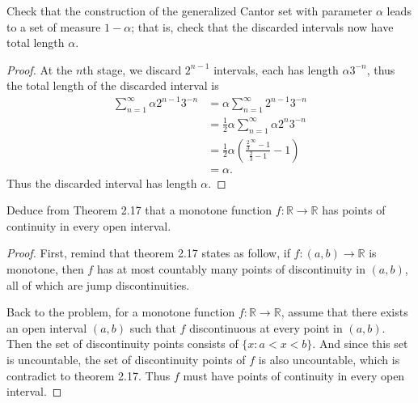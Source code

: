 \documentclass[12pt, a4paper]{article}
\theoremstyle{plain}
\newcommand{\R}{\mathbb{R}}
\begin{document}
\begin{exercise}{30}
Check that the construction of the generalized Cantor set with parameter $\alpha$ leads to a set of measure $1-\alpha$; that is, check that the discarded intervals now have total length $\alpha$.
\end{exercise}
	\begin{proof}
	At the $n$th stage, we discard $2^{n-1}$ intervals, each has length $\alpha 3^{-n}$, thus the total length of the discarded interval is
	\begin{align*}
	\sum_{n=1}^{\infty}{\alpha 2^{n-1}3^{-n}}&=\alpha\sum_{n=1}^{\infty}{2^{n-1}3^{-n}}\\
	&=\frac{1}{2}\alpha\sum_{n=1}^{\infty}{\alpha 2^{n}3^{-n}}\\
	&=\frac{1}{2}\alpha\left(\frac{\frac{2}{3}^{\infty}-1}{\frac{2}{3}-1}-1\right)\\
	&=	\alpha.
	\end{align*}
	Thus the discarded interval has length $\alpha$.
	\end{proof}
	
\begin{exercise}{32}
Deduce from Theorem 2.17 that a monotone function $f:\R\rightarrow\R$ has points of continuity in every open interval.
\end{exercise}
	\begin{proof}
	First, remind that theorem 2.17 states as follow, if $f : (a, b)\rightarrow\R$ is monotone, then $f$ has at most countably many points of discontinuity in $(a, b)$, all of which are jump discontinuities.
	
	Back to the problem, for a monotone function $f:\R\rightarrow\R$, assume that there exists an open interval $(a,b)$ such that $f$ discontinuous at every point in $(a,b)$. Then the set of discontinuity points consists of $\{x:a<x<b\}$. And since this set is uncountable, the set of discontinuity points of $f$ is also uncountable, which is contradict to theorem 2.17. Thus $f$ must have points of continuity in every open interval.
	\end{proof}
	
\end{document}
